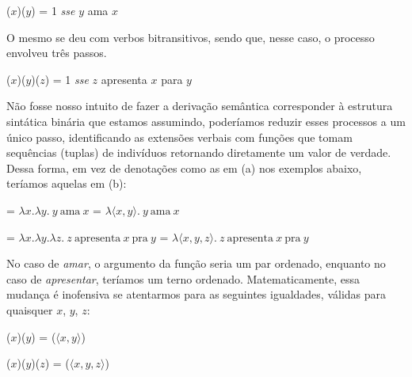 \begin{exe}
	\ex {}($x$)($y$) = 1 \textit{sse} $y$ ama $x$
\end{exe}

\n O mesmo se deu com verbos bitransitivos, sendo que, nesse caso, o processo envolveu três passos.

\begin{exe}
	\ex {}($x$)($y$)($z$) = 1 \textit{sse} $z$ apresenta $x$ para $y$
\end{exe}

\n Não fosse nosso intuito de fazer a derivação semântica corresponder à estrutura sintática binária que estamos assumindo, poderíamos reduzir esses processos a um único passo, identificando as extensões verbais com funções que tomam sequências (tuplas) de indivíduos retornando diretamente um valor de verdade. Dessa forma, em vez de denotações como as em (a) nos exemplos abaixo, teríamos aquelas em (b):

\begin{exe}
	\ex
	\begin{xlist}
\ex {} = $\lambda x.\lambda y.\ y\ \text{ama}\ x$
\ex {} = $\lambda\langle x,y \rangle.\  y\ \text{ama}\ x$
	\end{xlist}
\end{exe}

\begin{exe}
	\ex
	\begin{xlist}
		\ex {} = $\lambda x.\lambda y.\lambda z.\ z\ \text{apresenta}\ x\ \text{pra}\ y$
		\ex {} = $\lambda\langle x,y,z \rangle.\ z\ \text{apresenta}\ x\ \text{pra}\ y$
	\end{xlist}
\end{exe}

\n No caso de \textit{amar}, o argumento da função seria um par ordenado, enquanto no caso de \textit{apresentar}, teríamos um terno ordenado. Matematicamente, essa mudança é inofensiva se atentarmos para as seguintes igualdades, válidas para quaisquer $x$, $y$, $z$:

\begin{exe}
	\ex {}($x$)($y$) = ($\langle x,y \rangle$)
\end{exe}

\begin{exe}
	\ex {}($x$)($y$)($z$) =  ($\langle x,y,z \rangle$)
\end{exe} 

